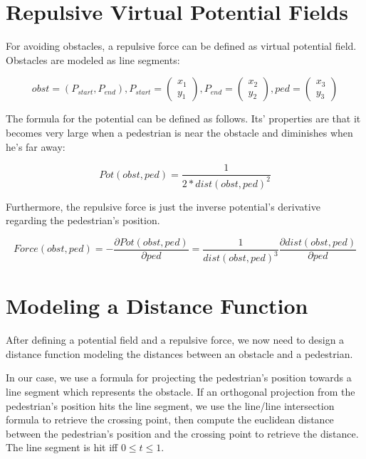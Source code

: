 \documentclass[fleqn]{article}
\author{Marco Tröster }
\date{October 27th, 2022}
\begin{document}
\maketitle

\section{Repulsive Virtual Potential Fields}

For avoiding obstacles, a repulsive force can be defined as virtual potential field.
Obstacles are modeled as line segments:

$$obst = (P_{start}, P_{end}), P_{start} = \begin{pmatrix} x_1 \\ y_1 \end{pmatrix}, P_{end} =\begin{pmatrix} x_2 \\ y_2 \end{pmatrix}, ped = \begin{pmatrix} x_3 \\ y_3 \end{pmatrix}$$

The formula for the potential can be defined as follows. Its' properties are that it becomes
very large when a pedestrian is near the obstacle and diminishes when he's far away:

$$Pot(obst, ped) = \frac{1}{2 * dist(obst, ped)^2}$$

Furthermore, the repulsive force is just the inverse potential's derivative
regarding the pedestrian's position.

$$Force(obst, ped) = - \frac{\partial Pot(obst, ped)}{\partial ped} = \frac{1}{dist(obst, ped)^3} \frac{\partial dist(obst, ped)}{\partial ped}$$

\section{Modeling a Distance Function}

After defining a potential field and a repulsive force, we now need to design a
distance function modeling the distances between an obstacle and a pedestrian.

In our case, we use a formula for projecting the pedestrian's position towards
a line segment which represents the obstacle. If an orthogonal projection from the
pedestrian's position hits the line segment, we use the line/line intersection formula
to retrieve the crossing point, then compute the euclidean distance between the
pedestrian's position and the crossing point to retrieve the distance.
The line segment is hit iff $0 	\leq t 	\leq 1$.
\end{document}
